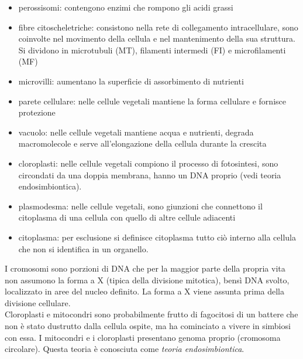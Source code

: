 \begin{itemize}
        \item perossisomi: contengono enzimi che rompono gli acidi grassi
        \item fibre citoscheletriche: consistono nella rete di collegamento intracellulare, sono coinvolte nel movimento della cellula e nel mantenimento della sua struttura. 
        Si dividono in microtubuli (MT), filamenti intermedi (FI) e microfilamenti (MF)
        \item microvilli: aumentano la superficie di assorbimento di nutrienti \\
        \item parete cellulare: nelle cellule vegetali mantiene la forma cellulare e fornisce protezione
        \item vacuolo: nelle cellule vegetali mantiene acqua e nutrienti, degrada macromolecole e serve all'elongazione della cellula durante la crescita
        \item cloroplasti: nelle cellule vegetali compiono il processo di fotosintesi, sono circondati da una doppia membrana, hanno un DNA proprio (vedi teoria endosimbiontica).
        \item plasmodesma: nelle cellule vegetali, sono giunzioni che connettono il citoplasma di una cellula con quello di altre cellule adiacenti
        \item citoplasma: per esclusione si definisce citoplasma tutto ciò interno alla cellula che non si identifica in un organello.
    \end{itemize}
    I cromosomi sono porzioni di DNA che per la maggior parte della propria vita non assumono la forma a X (tipica della divisione mitotica), bensì DNA svolto, localizzato in aree del nucleo definito. La forma a X viene assunta prima della divisione cellulare.\\
    Cloroplasti e mitocondri sono probabilmente frutto di fagocitosi di un battere che non è stato dustrutto dalla cellula ospite, ma ha cominciato a vivere in simbiosi con essa. I mitocondri e i cloroplasti presentano genoma proprio (cromosoma circolare). Questa teoria è conosciuta come \textit{teoria endosimbiontica}.

